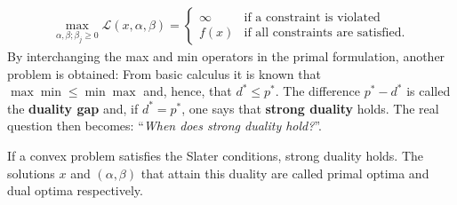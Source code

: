     \begin{gather}
        \max_{\alpha,\beta;\beta_j\geq0}\mathcal{L}(x,\alpha,\beta) =
        \begin{cases}
            \infty&\text{if a constraint is violated}\\
            f(x)&\text{if all constraints are satisfied}.
        \end{cases}
    \end{gather}
    By interchanging the max and min operators in the primal formulation, another problem is obtained:
    From basic calculus it is known that $\max\min\leq\min\max$ and, hence, that $d^*\leq p^*$. The difference $p^*-d^*$ is called the \textbf{duality gap} and, if $d^*=p^*$, one says that \textbf{strong duality} holds. The real question then becomes: ``\textit{When does strong duality hold?}''.
    \begin{property}
        If a convex problem satisfies the Slater conditions, strong duality holds. The solutions $x$ and $(\alpha,\beta)$ that attain this duality are called primal optima and dual optima respectively.
    \end{property}

